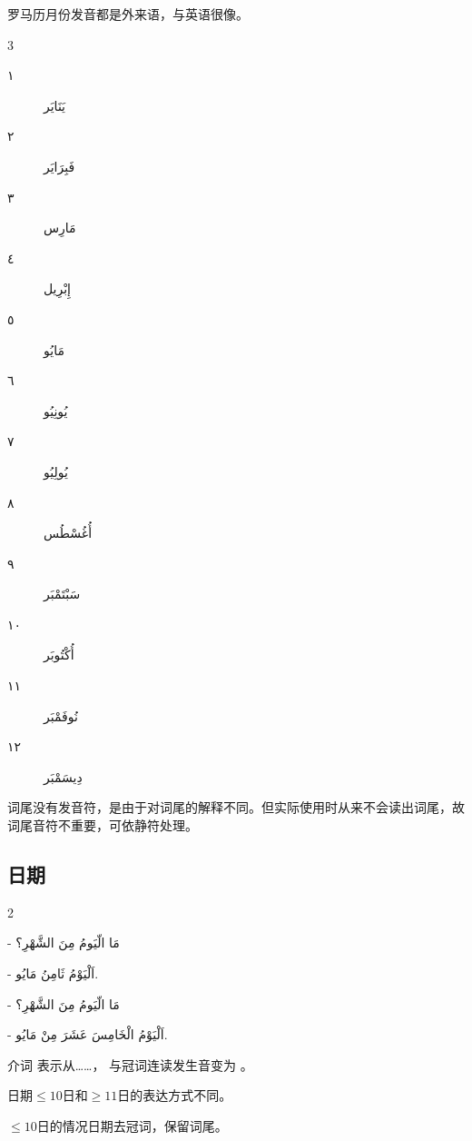罗马历月份发音都是外来语，与英语很像。

\begin{Arabic}
    \begin{multicols}{3}
        \begin{description}
            \item[١] يَنَايَر\red{$^*$}
            \item[٢] فَبِرَايَر
            \item[٣] مَارِس
            \item[٤] إِبْرِيل
            \item[٥] مَايُو
            \item[٦] يُونِيُو
            \item[٧] يُولِيُو
            \item[٨] أُغُسْطُس
            \item[٩] سَبْتَمْبَر
            \item[١٠] أُكْتُوبَر
            \item[١١] نُوفَمْبَر
            \item[١٢] دِيسَمْبَر
        \end{description}
    \end{multicols}
\end{Arabic}

\begin{attention}
    \red{$^*$} 词尾没有发音符，是由于对词尾的解释不同。但实际使用时从来不会读出词尾，故词尾音符不重要，可依静符处理。
\end{attention}

\subsection{日期}

\begin{multicols}{2}
    \begin{Arabic}
    - مَا الّيَومُ مِنَ الشَّهْرِ؟

    - اَلْيَوْمُ ثَامِنُ مَايُو.
    \end{Arabic}

    \begin{Arabic}
    - مَا الّيَومُ مِنَ الشَّهْرِ؟
    
    - اَلْيَوْمُ الْخَامِسَ عَشَرَ مِنْ مَايُو.
    \end{Arabic}
\end{multicols}


\begin{attention}
    介词  表示从……， 与冠词连读发生音变为  。

    日期$\leqslant 10$日和$\geqslant 11$日的表达方式不同。

    $\leqslant 10$日的情况日期去冠词，保留词尾。
\end{attention}

